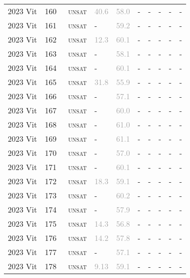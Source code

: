 \begin{center}
{\begin{longtable}{@{}llllllllll@{}}
2023 Vit & 160 & ~\textsc{unsat} & \textcolor{darkgray}{40.6} & \textcolor{darkgray}{58.0} & - & - & - & - & - \\
2023 Vit & 161 & ~\textsc{unsat} & - & \textcolor{darkgray}{59.2} & - & - & - & - & - \\
2023 Vit & 162 & ~\textsc{unsat} & \textcolor{darkgray}{12.3} & \textcolor{darkgray}{60.1} & - & - & - & - & - \\
2023 Vit & 163 & ~\textsc{unsat} & - & \textcolor{darkgray}{58.1} & - & - & - & - & - \\
2023 Vit & 164 & ~\textsc{unsat} & - & \textcolor{darkgray}{60.1} & - & - & - & - & - \\
2023 Vit & 165 & ~\textsc{unsat} & \textcolor{darkgray}{31.8} & \textcolor{darkgray}{55.9} & - & - & - & - & - \\
2023 Vit & 166 & ~\textsc{unsat} & - & \textcolor{darkgray}{57.1} & - & - & - & - & - \\
2023 Vit & 167 & ~\textsc{unsat} & - & \textcolor{darkgray}{60.0} & - & - & - & - & - \\
2023 Vit & 168 & ~\textsc{unsat} & - & \textcolor{darkgray}{61.0} & - & - & - & - & - \\
2023 Vit & 169 & ~\textsc{unsat} & - & \textcolor{darkgray}{61.1} & - & - & - & - & - \\
2023 Vit & 170 & ~\textsc{unsat} & - & \textcolor{darkgray}{57.0} & - & - & - & - & - \\
2023 Vit & 171 & ~\textsc{unsat} & - & \textcolor{darkgray}{60.1} & - & - & - & - & - \\
2023 Vit & 172 & ~\textsc{unsat} & \textcolor{darkgray}{18.3} & \textcolor{darkgray}{59.1} & - & - & - & - & - \\
2023 Vit & 173 & ~\textsc{unsat} & - & \textcolor{darkgray}{60.2} & - & - & - & - & - \\
2023 Vit & 174 & ~\textsc{unsat} & - & \textcolor{darkgray}{57.9} & - & - & - & - & - \\
2023 Vit & 175 & ~\textsc{unsat} & \textcolor{darkgray}{14.3} & \textcolor{darkgray}{56.8} & - & - & - & - & - \\
2023 Vit & 176 & ~\textsc{unsat} & \textcolor{darkgray}{14.2} & \textcolor{darkgray}{57.8} & - & - & - & - & - \\
2023 Vit & 177 & ~\textsc{unsat} & - & \textcolor{darkgray}{57.1} & - & - & - & - & - \\
2023 Vit & 178 & ~\textsc{unsat} & \textcolor{darkgray}{9.13} & \textcolor{darkgray}{59.1} & - & - & - & - & - \\

\end{longtable}}
\end{center}

